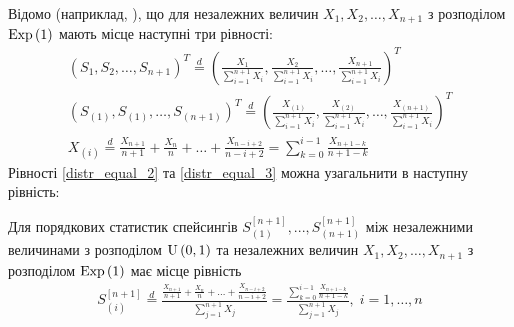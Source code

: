 Відомо (наприклад, \cite{Holst_1980}), що для незалежних величин 
$X_1, X_2, \dots, X_{n+1}$ з розподілом $\mathrm{Exp}\left(1\right)$
мають місце наступні три рівності:
\begin{gather}
    \label{distr_equal_1}
    \left(
        S_1, S_2, \dots, S_{n+1}
    \right)^T
    \overset{d}{=}
    \left(
        \frac{X_1}{\sum_{i=1}^{n+1} X_i},
        \frac{X_2}{\sum_{i=1}^{n+1} X_i},
        \dots,
        \frac{X_{n+1}}{\sum_{i=1}^{n+1} X_i}
    \right)^T \\
    \label{distr_equal_2}
    \left(
        S_{(1)}, S_{(1)}, \dots, S_{(n+1)}
    \right)^T
    \overset{d}{=}
    \left(
        \frac{X_{(1)}}{\sum_{i=1}^{n+1} X_i},
        \frac{X_{(2)}}{\sum_{i=1}^{n+1} X_i},
        \dots,
        \frac{X_{(n+1)}}{\sum_{i=1}^{n+1} X_i}
    \right)^T \\
    \label{distr_equal_3}
    X_{(i)} \overset{d}{=}
    \frac{X_{n+1}}{n+1} + \frac{X_{n}}{n} + \dots + \frac{X_{n-i+2}}{n-i+2} = 
    \sum_{k=0}^{i-1} \frac{X_{n+1-k}}{n+1-k}
\end{gather}
Рівності \eqref{distr_equal_2} та \eqref{distr_equal_3}
можна узагальнити в наступну рівність:
\begin{lemma}\label{distr_equal}
    Для порядкових статистик спейсингів 
    $S_{(1)}^{[n+1]}, ..., S_{(n+1)}^{[n+1]}$
    між незалежними величинами з розподілом $\mathrm{U}\left(0, 1\right)$
    та незалежних величин 
    $X_1, X_2, \dots, X_{n+1}$ з розподілом $\mathrm{Exp}\left(1\right)$ має місце
    рівність 
    \begin{gather}\label{distr_equal_4}
        S_{(i)}^{[n+1]} \overset{d}{=}
        \frac{
            \frac{X_{n+1}}{n+1} + \frac{X_{n}}{n} + \dots + \frac{X_{n-i+2}}{n-i+2}
        }{
            \sum_{j=1}^{n+1} X_j
        } = \frac{
            \sum_{k=0}^{i-1} \frac{X_{n+1-k}}{n+1-k}
        }{
            \sum_{j=1}^{n+1} X_j
        }, \; i = 1, \dots, n
    \end{gather}
\end{lemma}
